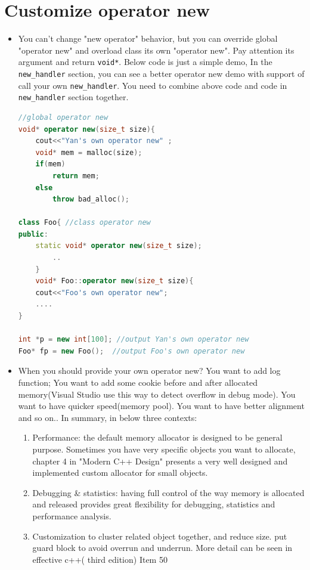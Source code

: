 \documentclass[a4paper,11pt,twoside]{book}
\begin{document}
\section{Customize operator new}
\begin{itemize}
	\item You can't change "new operator" behavior, but you can override global "operator new" and overload class its own "operator new". Pay attention its argument and return \texttt{void*}. Below code is just a simple demo, In the \texttt{new\_handler} section, you can see a better operator new demo with support of call your own \texttt{new\_handler}. You need to combine above code and code in \texttt{new\_handler} section together. 
	
\begin{lstlisting}[frame=single, language=c++, mathescape=true]
//global operator new
void* operator new(size_t size){
	cout<<"Yan's own operator new" ;
	void* mem = malloc(size);
	if(mem)
		return mem;
	else
		throw bad_alloc();
	
class Foo{ //class operator new
public:
	static void* operator new(size_t size);
		..
	}
	void* Foo::operator new(size_t size){
	cout<<"Foo's own operator new";
	....
}
	
int *p = new int[100]; //output Yan's own operator new
Foo* fp = new Foo();  //output Foo's own operator new
\end{lstlisting}
	
	\item When you should provide your own operator new?  You want to add log function; You want to add some cookie before and after allocated memory(Visual Studio use this way to detect overflow in debug mode). You want to have quicker speed(memory pool). You want to have better alignment and so on.. In summary, in below three contexts:
	\begin{enumerate}
		\item Performance: the default memory allocator is designed to be general purpose. Sometimes you have very specific objects you want to allocate, chapter 4 in "Modern C++ Design" presents a very well designed and implemented custom allocator for small objects.
		
		\item Debugging \& statistics: having full control of the way memory is allocated and released provides great flexibility for debugging, statistics and performance analysis.
		
		\item Customization to cluster related object together, and reduce size. put guard block to avoid overrun and underrun. More detail can be seen in effective c++( third edition) Item 50
	\end{enumerate}
	

\end{itemize}
\end{document}
